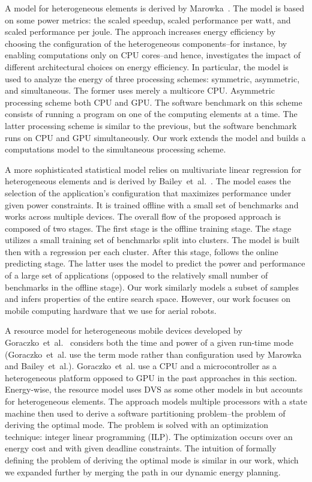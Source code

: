A model for heterogeneous elements is derived by Marowka~\citep{marowka2017energy}. The model is based on some power metrics: the scaled speedup, scaled performance per watt, and scaled performance per joule. The approach increases energy efficiency by choosing the configuration of the heterogeneous components--for instance, by enabling computations only on CPU cores--and hence, investigates the impact of different architectural choices on energy efficiency. In particular, the model is used to analyze the energy of three processing schemes: symmetric, asymmetric, and simultaneous. The former uses merely a multicore CPU. Asymmetric processing scheme both CPU and GPU. The software benchmark on this scheme consists of running a program on one of the computing elements at a time. The latter processing scheme is similar to the previous, but the software benchmark runs on CPU and GPU simultaneously. Our work extends the model and builds a computations model to the simultaneous processing scheme.

A more sophisticated statistical model relies on multivariate linear regression for heterogeneous elements and is derived by Bailey~et~al.~\citep{bailey2014adaptive}. The model eases the selection of the application's configuration that maximizes performance under given power constraints. It is trained offline with a small set of benchmarks and works across multiple devices. The overall flow of the proposed approach is composed of two stages. The first stage is the offline training stage. The stage utilizes a small training set of benchmarks split into clusters. The model is built then with a regression per each cluster. After this stage, follows the online predicting stage. The latter uses the model to predict the power and performance of a large set of applications (opposed to the relatively small number of benchmarks in the offline stage). Our work similarly models a subset of samples and infers properties of the entire search space. However, our work focuses on mobile computing hardware that we use for aerial robots.

A resource model for heterogeneous mobile devices developed by Goraczko~et~al.~\citep{goraczko2008energy} considers both the time and power of a given run-time mode (Goraczko~et~al. use the term mode rather than configuration used by Marowka and Bailey~et~al.). Goraczko~et~al. use a CPU and a microcontroller as a heterogeneous platform opposed to GPU in the past approaches in this section. Energy-wise, the resource model uses DVS as some other models in  but accounts for heterogeneous elements. The approach models multiple processors with a state machine then used to derive a software partitioning problem--the problem of deriving the optimal mode. The problem is solved with an optimization technique: integer linear programming (ILP). The optimization occurs over an energy cost and with given deadline constraints. The intuition of formally defining the problem of deriving the optimal mode is similar in our work, which we expanded further by merging the path in our dynamic energy planning.

